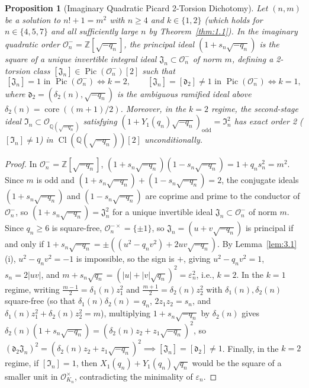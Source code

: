 \documentclass[11pt,reqno]{amsart}
\newtheorem{proposition}[theorem]{Proposition}
\theoremstyle{remark}
\numberwithin{equation}{section}
\newcommand{\Z}{\mathbb{Z}}
\newcommand{\Q}{\mathbb{Q}}
\DeclareMathOperator{\core}{core}
\DeclareMathOperator{\Cl}{Cl}
\DeclareMathOperator{\Pic}{Pic}
\begin{document}
\begin{proposition}[{Imaginary Quadratic Picard 2-Torsion Dichotomy}]\label{prop:3.3}
Let $(n, m)$ be a solution to $n! + 1 = m^2$ with $n \ge 4$ and $k \in \{1, 2\}$ (which holds for $n \in \{4, 5, 7\}$ and all sufficiently large $n$ by Theorem~\ref{thm:1.1}). In the imaginary quadratic order $\mathcal{O}_n^- = \Z[\sqrt{-q_n}]$, the principal ideal $(1 + s_n\sqrt{-q_n})$ is the square of a unique invertible integral ideal $\mathfrak{J}_n \subset \mathcal{O}_n^-$ of norm $m$, defining a 2-torsion class $[\mathfrak{J}_n] \in \Pic(\mathcal{O}_n^-)[2]$ such that
\begin{equation}\label{eq:3.8}
[\mathfrak{J}_n] = 1 \text{ in } \Pic(\mathcal{O}_n^-) \iff k = 2, \qquad [\mathfrak{J}_n] = [\mathfrak{d}_2] \ne 1 \text{ in } \Pic(\mathcal{O}_n^-) \iff k = 1,
\end{equation}
where $\mathfrak{d}_2 = (\delta_2(n), \sqrt{-q_n})$ is the ambiguous ramified ideal above $\delta_2(n) = \core((m + 1)/2)$. Moreover, in the $k = 2$ regime, the second-stage ideal $\mathfrak{I}_n \subset \mathcal{O}_{\Q(\sqrt{-q_n})}$ satisfying $(1 + Y_1(q_n)\sqrt{-q_n})_{\mathrm{odd}} = \mathfrak{I}_n^2$ has exact order 2 ($[\mathfrak{I}_n] \ne 1$) in $\Cl(\Q(\sqrt{-q_n}))[2]$ unconditionally.
\end{proposition}

\begin{proof}
In $\mathcal{O}_n^- = \Z[\sqrt{-q_n}]$, $(1 + s_n\sqrt{-q_n})(1 - s_n\sqrt{-q_n}) = 1 + q_n s_n^2 = m^2$. Since $m$ is odd and $(1 + s_n\sqrt{-q_n}) + (1 - s_n\sqrt{-q_n}) = 2$, the conjugate ideals $(1 + s_n\sqrt{-q_n})$ and $(1 - s_n\sqrt{-q_n})$ are coprime and prime to the conductor of $\mathcal{O}_n^-$, so $(1 + s_n\sqrt{-q_n}) = \mathfrak{J}_n^2$ for a unique invertible ideal $\mathfrak{J}_n \subset \mathcal{O}_n^-$ of norm $m$. Since $q_n \ge 6$ is square-free, $\mathcal{O}_n^{-\times} = \{\pm 1\}$, so $\mathfrak{J}_n = (u + v\sqrt{-q_n})$ is principal if and only if $1 + s_n\sqrt{-q_n} = \pm((u^2 - q_n v^2) + 2uv\sqrt{-q_n})$. By Lemma~\ref{lem:3.1}(i), $u^2 - q_n v^2 = -1$ is impossible, so the sign is $+$, giving $u^2 - q_n v^2 = 1$, $s_n = 2|uv|$, and $m + s_n\sqrt{q_n} = (|u| + |v|\sqrt{q_n})^2 = \varepsilon_n^2$, i.e., $k = 2$. In the $k = 1$ regime, writing $\frac{m - 1}{2} = \delta_1(n)z_1^2$ and $\frac{m + 1}{2} = \delta_2(n)z_2^2$ with $\delta_1(n), \delta_2(n)$ square-free (so that $\delta_1(n)\delta_2(n) = q_n$, $2z_1 z_2 = s_n$, and $\delta_1(n)z_1^2 + \delta_2(n)z_2^2 = m$), multiplying $1 + s_n\sqrt{-q_n}$ by $\delta_2(n)$ gives $\delta_2(n)(1 + s_n\sqrt{-q_n}) = (\delta_2(n)z_2 + z_1\sqrt{-q_n})^2$, so $(\mathfrak{d}_2\mathfrak{J}_n)^2 = (\delta_2(n)z_2 + z_1\sqrt{-q_n})^2 \implies [\mathfrak{J}_n] = [\mathfrak{d}_2] \ne 1$. Finally, in the $k = 2$ regime, if $[\mathfrak{I}_n] = 1$, then $X_1(q_n) + Y_1(q_n)\sqrt{q_n}$ would be the square of a smaller unit in $\mathcal{O}_{K_n}^\times$, contradicting the minimality of $\varepsilon_n$.
\end{proof}
\end{document}
